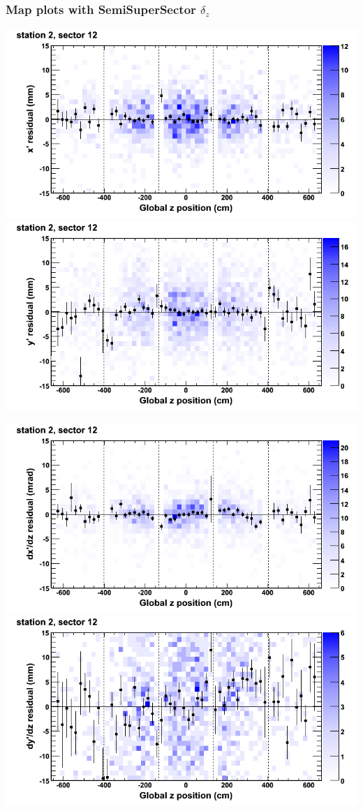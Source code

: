 \documentclass[compress]{beamer}
\begin{document}
\begin{frame}
\frametitle{Map plots with SemiSuperSector $\delta_z$}
\includegraphics[width=0.5\linewidth]{zfit_mapplots/DTvsz_st2sec12_x.png}
\includegraphics[width=0.5\linewidth]{zfit_mapplots/DTvsz_st2sec12_y.png}

\includegraphics[width=0.5\linewidth]{zfit_mapplots/DTvsz_st2sec12_dxdz.png}
\includegraphics[width=0.5\linewidth]{zfit_mapplots/DTvsz_st2sec12_dydz.png}
\end{frame}
\end{document}
